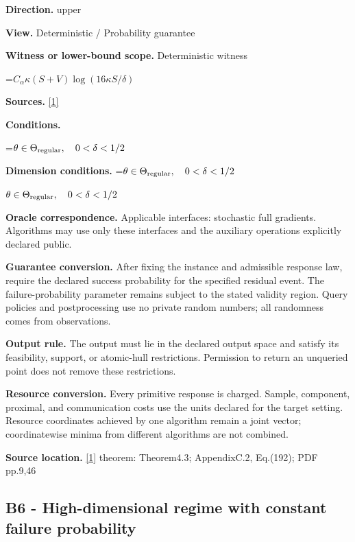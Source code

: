 \documentclass[10pt,a4paper]{article}
\newcommand{\AtlasMath}[1]{\par\begingroup\centering\setbox0=\hbox{$\displaystyle #1$}\ifdim\wd0>1.4\linewidth\typeout{ATLAS WIDE FORMULA: \the\wd0}\fi\ifdim\wd0>\linewidth\resizebox{\linewidth}{!}{\box0}\else\box0\fi\par\endgroup}
\newcommand{\AtlasInlineMath}[1]{\begingroup\setbox0=\hbox{$#1$}\ifdim\wd0>.4\linewidth\endgroup\AtlasMath{#1}\else\endgroup$#1$\fi}
\begin{document}
\textbf{Direction.} upper



\textbf{View.} Deterministic / Probability guarantee



\textbf{Witness or lower-bound scope.} Deterministic witness



\AtlasMath{C_\alpha\kappa(S+V)\log(16\kappa S/\delta)}


\textbf{Sources.} \href{https://arxiv.org/pdf/2609.03990}{[1]}



\textbf{Conditions.}
\AtlasMath{\theta\in\Theta_{\rm regular},\quad0<\delta<1/2}




\textbf{Dimension conditions.} \AtlasInlineMath{\theta\in\Theta_{\rm regular},\quad0<\delta<1/2}



\textbf{Oracle correspondence.} Applicable interfaces: stochastic full gradients. Algorithms may use only these interfaces and the auxiliary operations explicitly declared public.



\textbf{Guarantee conversion.} After fixing the instance and admissible response law, require the declared success probability for the specified residual event. The failure-probability parameter remains subject to the stated validity region. Query policies and postprocessing use no private random numbers; all randomness comes from observations.



\textbf{Output rule.} The output must lie in the declared output space and satisfy its feasibility, support, or atomic-hull restrictions. Permission to return an unqueried point does not remove these restrictions.



\textbf{Resource conversion.} Every primitive response is charged. Sample, component, proximal, and communication costs use the units declared for the target setting. Resource coordinates achieved by one algorithm remain a joint vector; coordinatewise minima from different algorithms are not combined.



\textbf{Source location.} \href{https://arxiv.org/pdf/2609.03990}{[1]} theorem: Theorem4.3; AppendixC.2, Eq.(192); PDF pp.9,46



\subsection{B6 - High-dimensional regime with constant failure probability}
\end{document}
